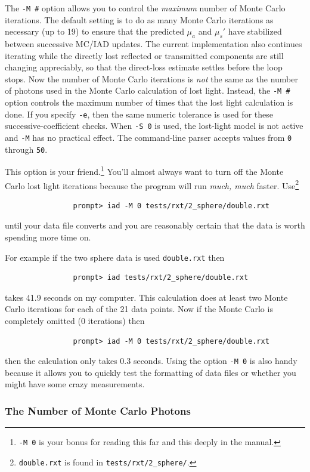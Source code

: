 \documentclass{article}
\begin{document}
The \texttt{-M \#} option allows you to control the \textit{maximum} number of Monte
Carlo iterations.  The default setting is to do as many Monte Carlo iterations
as necessary (up to 19) to ensure that the predicted $\mu_a$ and $\mu_s'$ have
stabilized between successive MC/IAD updates.  The current implementation also
continues iterating while the directly lost reflected or transmitted components
are still changing appreciably, so that the direct-loss estimate settles before
the loop stops.  Now the number of Monte Carlo iterations is \textit{not} the same as
the number of photons used in the Monte Carlo calculation of lost light.
Instead, the \texttt{-M \#} option controls the maximum number of times that the
lost light calculation is done.  If you specify \texttt{-e}, then the same
numeric tolerance is used for these successive-coefficient checks.  When
\texttt{-S 0} is used, the lost-light model is not active and \texttt{-M}
has no practical effect.  The command-line parser accepts values from
\texttt{0} through \texttt{50}.

This option is your friend.\footnote{\texttt{-M 0} is your bonus for reading this far and
this deeply in the manual.} You'll almost always want to turn off the Monte Carlo
lost light iterations because the program will run \textit{much, much} faster.  
Use\footnote{\texttt{double.rxt} is found in \texttt{tests/rxt/2\_sphere/}.}
\begin{verbatim}
                prompt> iad -M 0 tests/rxt/2_sphere/double.rxt
\end{verbatim}
until your data file converts and you are reasonably certain that the data is 
worth spending more time on.  

For example
if the two sphere data is used \texttt{double.rxt} then
\begin{verbatim}
                prompt> iad tests/rxt/2_sphere/double.rxt
\end{verbatim}
takes 41.9 seconds on my computer.  This calculation does at least two Monte
Carlo iterations for each of the 21 data points.  Now if the Monte Carlo is
completely omitted (0 iterations) then
\begin{verbatim}
                prompt> iad -M 0 tests/rxt/2_sphere/double.rxt
\end{verbatim}
then the calculation only takes 0.3 seconds.  Using the option \texttt{-M 0} is also
handy because it allows you to quickly test the formatting of data files or
whether you might have some crazy measurements.

\subsubsection{The Number of Monte Carlo Photons}
\end{document}
